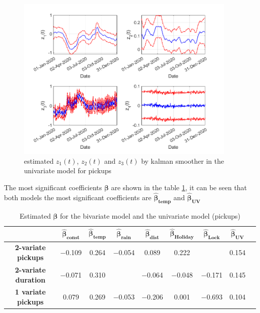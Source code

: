 \begin{figure}
	\centering
	\includegraphics[height=300px]{Images/biv_sel.png}
	\caption[Estimated of latent z]{estimated $z_{1}(t)$,  $z_{2}(t)$ and $z_{3}(t)$ by kalman smoother in the univariate model for pickups}
	\label{Trend_zeta_latente}
\end{figure}

The most significant coefficients $\boldsymbol{\hat{\beta}}$ are shown in the  table \ref{z_latent trend}, it can be seen that both models the most significant coefficients are $\boldsymbol{\hat{\beta}_{temp}}$ and $\boldsymbol{\hat{\beta}_{UV}}$
 \begin{table}
	\centering
	\renewcommand\arraystretch{1.3}
	\begin{tabular}{c|c|c|c|c|c|c|c|c}
		\hline
		\textit{} & $\boldsymbol{\hat{\beta}_{const}}$ & $\boldsymbol{\hat{\beta}_{temp}}$ & $\boldsymbol{\hat{\beta}_{rain}}$ & $\boldsymbol{\hat{\beta}_{dist}}$ & $\boldsymbol{\hat{\beta}_{Holiday}}$ & $\boldsymbol{\hat{\beta}_{Lock}}$ & $\boldsymbol{\hat{\beta}_{UV}}$   \\
		\hline
		\textbf{2-variate pickups} & \num{-0.109} & \num{+0.264} & \num{-0.054} & \num{+0.089} & \num{+0.222} &  & \num{+0.154}  \\
		\hline
		\textbf{2-variate duration} & \num{-0.071} & \num{+0.310} &  & \num{-0.064} & \num{-0.048} & \num{-0.171} & \num{+0.145}  \\
		\hline
		\textbf{1 variate pickups} & \num{+0.079} & \num{+0.269} & \num{-0.053} & \num{-0.206} & \num{+0.001} & \num{-0.693} & \num{+0.104}\\
		\hline
	\end{tabular}
	\caption[Estimated $\boldsymbol{\beta}$ for the multivariate model model and the univariate model (pickups-DCM)]{Estimated $\boldsymbol{\beta}$ for the bivariate model and the univariate model (pickups) }
	\label{z_latent trend}
\end{table}